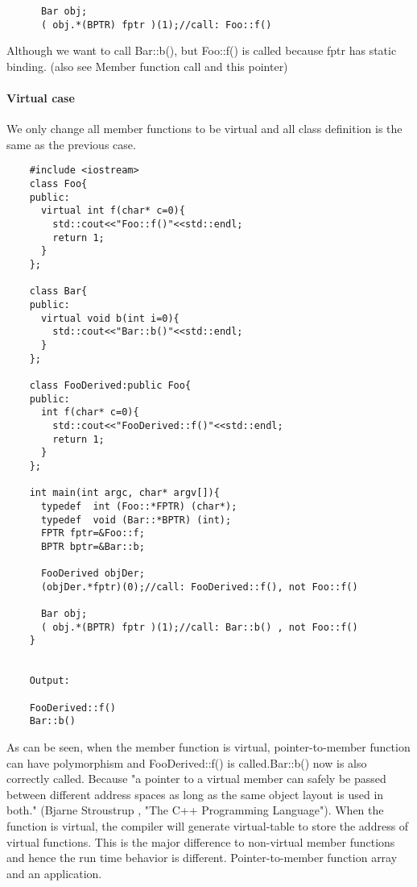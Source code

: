 \documentclass{book}
\begin{document}
\begin{lstlisting}
      Bar obj;
      ( obj.*(BPTR) fptr )(1);//call: Foo::f()

\end{lstlisting}
Although we want to call Bar::b(), but Foo::f() is called because fptr has static binding. (also see Member function call and this pointer)
\paragraph{Virtual case}

We only change all member functions to be virtual and all class definition is the same as the previous case.

\begin{lstlisting}
    #include <iostream>
    class Foo{
    public:
      virtual int f(char* c=0){
        std::cout<<"Foo::f()"<<std::endl;
        return 1;
      }
    };
     
    class Bar{
    public:
      virtual void b(int i=0){
        std::cout<<"Bar::b()"<<std::endl;
      }
    };
     
    class FooDerived:public Foo{
    public:
      int f(char* c=0){
        std::cout<<"FooDerived::f()"<<std::endl;
        return 1;
      }
    };
     
    int main(int argc, char* argv[]){
      typedef  int (Foo::*FPTR) (char*);
      typedef  void (Bar::*BPTR) (int);
      FPTR fptr=&Foo::f;
      BPTR bptr=&Bar::b;
     
      FooDerived objDer;
      (objDer.*fptr)(0);//call: FooDerived::f(), not Foo::f()
     
      Bar obj;
      ( obj.*(BPTR) fptr )(1);//call: Bar::b() , not Foo::f()
    }
     

    Output:

    FooDerived::f()
    Bar::b()
\end{lstlisting}
As can be seen, when the member function is virtual, pointer-to-member function can have polymorphism and FooDerived::f() is called.Bar::b() now is also correctly called.
Because "a pointer to a virtual member can safely be passed between different address spaces as long as the same object layout is used in both."
(Bjarne Stroustrup , "The C++ Programming Language"). When the function is virtual, the compiler will generate virtual-table to store the address of virtual functions. 
This is the major difference to non-virtual member functions and hence the run time behavior is different.
Pointer-to-member function array and an application.
\end{document}
